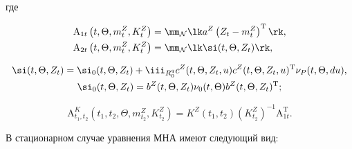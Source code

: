 \noindent

где



\vspace*{-6pt}



\noindent

   \begin{align*}

    \mathrm{A}_{1t} \left(t,\Theta,m_t^Z, K_t^Z\right)&=\mm_{\mathcal{N}} \lk a^Z \left (Z_t - m_t^Z\right)^{\mathrm{T}}\rk,

    \\

    \mathrm{A}_{2t} \left(t,\Theta,m_t^Z, K_t^Z\right)&=\mm_{\mathcal{N}} \lk  \si(t,\Theta,Z_t)\rk,

 \end{align*}

 

 \vspace*{-12pt}

 

 \noindent

 \begin{multline*}

        \si(t,\Theta,Z_t)= \si_0(t,\Theta,Z_t) +\iii_{R_0^q}  c^Z(t,\Theta,Z_t,u) c^Z (t,\Theta,Z_t,u)^{\mathrm{T}} \nu_P (t,\Theta,du),

   \\

    \si_0(t,\Theta,Z_t) =  b^Z (t,\Theta,Z_t) \nu_0 (t,\Theta) b^Z(t,\Theta,Z_t)^{\mathrm{T}};

   \end{multline*}

   

   \vspace*{-9pt}

   

   \noindent

  \begin{equation}

    \mathrm{A}_{t_1, t_2}^K \left(t_1, t_2, \Theta, m_{t_2}^Z, K_{t_2}^Z\right) = K^Z \left(t_1,  t_2\right) \left(K_{t_2}^Z\right)^{-1} \mathrm{A}_{1t}^{\mathrm{T}}.

    \label{e3.8-s}

    \end{equation}



В стационарном случае уравнения МНА имеют следующий вид:

